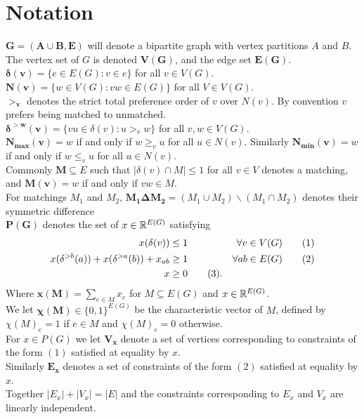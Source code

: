 \documentclass[letterpaper,12pt,oneside,onecolumn]{article}
\newcommand\numberthis{\addtocounter{equation}{1}\tag{\theequation}}
\begin{document}
\section*{Notation}
$\mathbf{G=(A\cup B, E)}$ will denote a bipartite graph with vertex partitions $A$ and $B$. The vertex set of $G$ is denoted $\mathbf{V(G)}$, and the edge set $\mathbf{E(G)}$.
\\
$\mathbf{\delta(v)} = \{e \in E(G) : v \in e\}$ for all $v \in V(G)$.
\\
$\mathbf{N(v)} = \{w \in V(G): vw \in E(G)\}$ for all $V\in V(G)$.
\\
$\mathbf{>_v}$ denotes the strict total preference order of $v$ over $N(v)$. By convention $v$ prefers being matched to unmatched.
\\
$\mathbf{\delta^{>w}(v)} = \{vu \in \delta(v) : u >_v w\}$ for all $v,w \in V(G)$.
\\
$\mathbf{N_{max}(v)} = w$ if and only if $w \geq_v u$ for all $u \in N(v)$. Similarly $\mathbf{N_{min}(v)} = w$ if and only if $w \leq_v u$ for all $u \in N(v)$.
\\
Commonly $\mathbf{M} \subseteq E$ such that $|\delta(v) \cap M| \leq 1$ for all $v \in V$ denotes a matching, and $\mathbf{M(v)} = w $ if and only if $vw \in M$. 
\\
For matchings $M_1$ and $M_2$, $\mathbf{M_1 \Delta M_2} = (M_1 \cup M_2) \backslash (M_1 \cap M_2)$ denotes their symmetric difference
\\
$\mathbf{P(G)}$ denotes the set of $x \in \mathbb{R}^{E(G)}$ satisfying
\begin{align*}
 x(\delta(v)) &\leq 1 &\forall v \in V(G) \numberthis \\
x(\delta^{>b}(a)) + x(\delta^{>a}(b)) + x_{ab} &\geq 1 &\forall ab \in E(G) \numberthis \\
x &\geq 0\numberthis.
\end{align*}
Where $\mathbf{x(M) }= \sum_{e \in M} x_e$ for $M \subseteq E(G)$ and $x \in \mathbb{R}^{E(G)}$.
\\
We let $\mathbf{\chi(M)} \in \{0,1\}^{E(G)}$ be the characteristic vector of $M$, defined by $\chi(M)_e = 1$ if $e\in M$ and $\chi(M)_e = 0$ otherwise.
\\
For $x \in P(G)$ we let $\mathbf{V_x}$ denote a set of vertices corresponding to constraints of the form $(1)$ satisfied at equality by $x$.
\\Similarly $\mathbf{E_x}$ denotes a set of constraints of the form $(2)$ satisfied at equality by $x$.
\\Together $|E_x| + |V_x| = |E|$ and the constraints corresponding to $E_x$ and $V_x$ are linearly independent.
\end{document}
